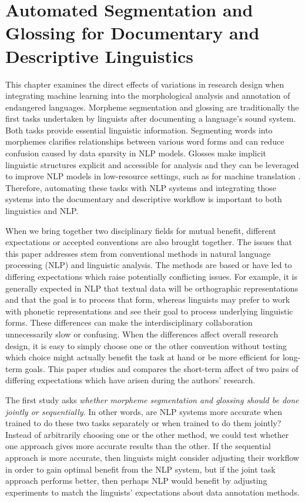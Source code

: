 \chapter{Automated Segmentation and Glossing for Documentary and Descriptive Linguistics}
\label{chap:seggloss}

This chapter examines the direct effects of variations in research design when integrating machine learning into the morphological analysis and annotation of endangered languages. Morpheme segmentation and glossing are traditionally the first tasks undertaken by linguists after documenting a language's sound system. Both tasks provide essential linguistic information. Segmenting words into morphemes clarifies relationships between various word forms and can reduce confusion caused by data sparsity in NLP models. Glosses make implicit linguistic structures explicit and accessible for analysis and they can be leveraged to improve NLP models in low-resource settings, such as for machine translation \citep{shearing_improving_2018,zhou_using_2020}. Therefore, automating these tasks with NLP systems and integrating those systems into the documentary and descriptive workflow is important to both linguistics and NLP.

When we bring together two disciplinary fields for mutual benefit, different expectations or accepted conventions are also brought together. The issues that this paper addresses stem from conventional methods in natural language processing (NLP) and linguistic analysis. The methods are based or have led to differing expectations which raise potentially conflicting issues. For example, it is generally expected in NLP that textual data will be orthographic representations and that the goal is to process that form, whereas linguists may prefer to work with phonetic representations and see their goal to process underlying linguistic forms. These differences can make the interdisciplinary collaboration unnecessarily slow or confusing. When the differences affect overall research design, it is easy to simply choose one or the other convention without testing which choice might actually benefit the task at hand or be more efficient for long-term goals. This paper studies and compares the short-term affect of two pairs of differing expectations which have arisen during the authors' research.

The first study asks \textit{whether morpheme segmentation and glossing should be done jointly or sequentially}. In other words, are NLP systems more accurate when trained to do these two tasks separately or when trained to do them jointly? Instead of arbitrarily choosing one or the other method, we could test whether one approach gives more accurate results than the other. If the sequential approach is more accurate, then linguists might consider adjusting their workflow in order to gain optimal benefit from the NLP system, but if the joint task approach performs better, then perhaps NLP would benefit by adjusting experiments to match the linguists' expectations about data annotation methods. 

